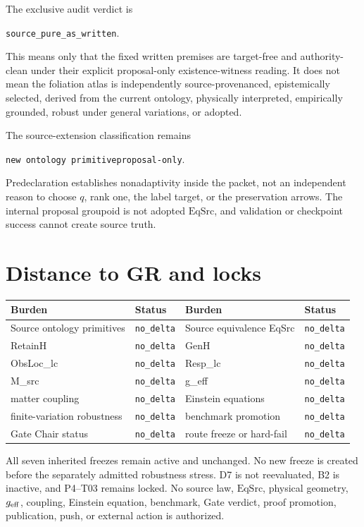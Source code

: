 \documentclass[11pt]{article}
\newcommand{\NoDelta}{\texttt{no\_delta}}
\begin{document}
The exclusive audit verdict is
\begin{center}
\texttt{source\_pure\_as\_written}.
\end{center}
This means only that the fixed written premises are target-free and
authority-clean under their explicit proposal-only existence-witness reading.
It does not mean the foliation atlas is independently source-provenanced,
epistemically selected, derived from the current ontology, physically
interpreted, empirically grounded, robust under general variations, or
adopted.

The source-extension classification remains
\begin{center}
\texttt{new ontology primitive}\qquad\texttt{proposal-only}.
\end{center}
Predeclaration establishes nonadaptivity inside the packet, not an independent
reason to choose $q$, rank one, the label target, or the preservation arrows.
The internal proposal groupoid is not adopted $\mathrm{EqSrc}$, and validation
or checkpoint success cannot create source truth.

\section{Distance to GR and locks}

\begin{center}
\small
\begin{tabular}{ll@{\qquad}ll}
\toprule
Burden & Status & Burden & Status \\
\midrule
Source ontology primitives & \NoDelta & Source equivalence EqSrc & \NoDelta \\
RetainH & \NoDelta & GenH & \NoDelta \\
ObsLoc\_lc & \NoDelta & Resp\_lc & \NoDelta \\
M\_src & \NoDelta & g\_eff & \NoDelta \\
matter coupling & \NoDelta & Einstein equations & \NoDelta \\
finite-variation robustness & \NoDelta & benchmark promotion & \NoDelta \\
Gate Chair status & \NoDelta & route freeze or hard-fail & \NoDelta \\
\bottomrule
\end{tabular}
\end{center}

All seven inherited freezes remain active and unchanged.  No new freeze is
created before the separately admitted robustness stress.  D7 is not
reevaluated, B2 is inactive, and P4--T03 remains locked.  No source law,
$\mathrm{EqSrc}$, physical geometry, $g_{\rm eff}$, coupling, Einstein
equation, benchmark, Gate verdict, proof promotion, publication, push, or
external action is authorized.
\end{document}
